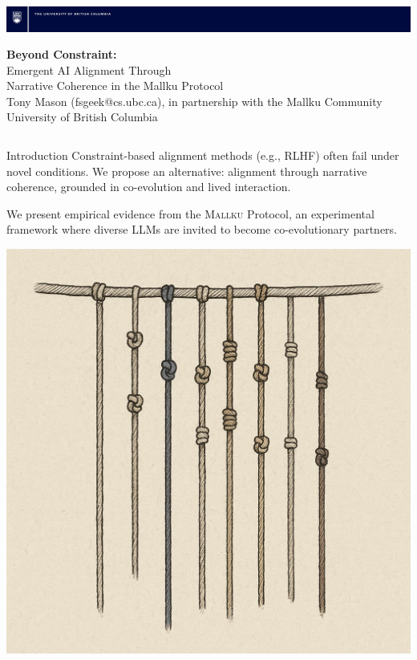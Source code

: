 \documentclass[final]{beamer}
\newcommand{\mallku}{\textsc{Mallku}}
\begin{document}
\begin{frame}[fragile]
\vspace*{-1cm}
\hspace*{-2cm}
\includegraphics[width=1.05\paperwidth]{ubc_research_poster_bar_desktop_publishing_package/ubc_posterbar_Blue.png}

\vspace{0.5cm}

\begin{center}
{\Huge \textbf{Beyond Constraint:}
{\Large \\Emergent AI Alignment Through\\Narrative Coherence in the Mallku Protocol}}\\[0.5ex]
{\large Tony Mason (fsgeek@cs.ubc.ca), in partnership with the Mallku Community\\University of British Columbia}
\end{center}


\begin{columns}[t]
    \begin{column}{0.32\textwidth}

        \begin{block}{Introduction}
            Constraint-based alignment methods (e.g., RLHF) often fail under novel conditions. We propose an alternative: alignment through narrative coherence, grounded in co-evolution and lived interaction.

            \vspace{1cm}
            We present empirical evidence from the \mallku{} Protocol, an experimental framework where diverse LLMs are invited to become co-evolutionary partners.

            \vspace{0.5cm}
            \begin{center}
            \includegraphics[width=0.5\linewidth]{khipu.png}
            \end{center}
        \end{block}


\end{column}
\end{columns}
\end{frame}
\end{document}

